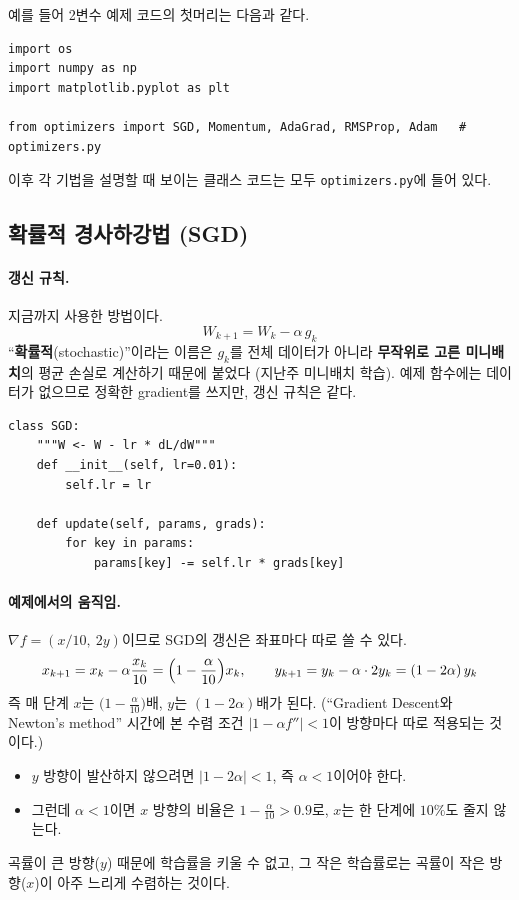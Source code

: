 \documentclass[11pt,a4paper]{article}
\begin{document}
예를 들어 2변수 예제 코드의 첫머리는 다음과 같다.
\begin{lstlisting}
import os
import numpy as np
import matplotlib.pyplot as plt

from optimizers import SGD, Momentum, AdaGrad, RMSProp, Adam   # optimizers.py
\end{lstlisting}
이후 각 기법을 설명할 때 보이는 클래스 코드는 모두 \texttt{optimizers.py}에 들어 있다.

\subsection{확률적 경사하강법 (SGD)}\label{sec:sgd}

\paragraph{갱신 규칙.}
지금까지 사용한 방법이다.
\[
\boxed{
W_{k+1}=W_k-\alpha\,g_k
}
\]
``\textbf{확률적}(stochastic)''이라는 이름은 $g_k$를 전체 데이터가 아니라
\textbf{무작위로 고른 미니배치}의 평균 손실로 계산하기 때문에 붙었다 (지난주 미니배치 학습).
예제 함수에는 데이터가 없으므로 정확한 gradient를 쓰지만, 갱신 규칙은 같다.

\begin{lstlisting}
class SGD:
    """W <- W - lr * dL/dW"""
    def __init__(self, lr=0.01):
        self.lr = lr

    def update(self, params, grads):
        for key in params:
            params[key] -= self.lr * grads[key]
\end{lstlisting}

\paragraph{예제에서의 움직임.}
$\nabla f=(x/10,\ 2y)$이므로 SGD의 갱신은 좌표마다 따로 쓸 수 있다.
\[
x_{k+1}=x_k-\alpha\frac{x_k}{10}=\Bigl(1-\frac{\alpha}{10}\Bigr)x_k,
\qquad
y_{k+1}=y_k-\alpha\cdot2y_k=(1-2\alpha)\,y_k
\]
즉 매 단계 $x$는 $\bigl(1-\frac{\alpha}{10}\bigr)$배, $y$는 $(1-2\alpha)$배가 된다.
(``Gradient Descent와 Newton's method'' 시간에 본 수렴 조건 $|1-\alpha f''|<1$이 방향마다 따로 적용되는 것이다.)

\begin{itemize}[leftmargin=1.8em]
\item $y$ 방향이 발산하지 않으려면 $|1-2\alpha|<1$, 즉 $\alpha<1$이어야 한다.
\item 그런데 $\alpha<1$이면 $x$ 방향의 비율은 $1-\frac{\alpha}{10}>0.9$로, $x$는 한 단계에 $10\%$도 줄지 않는다.
\end{itemize}
곡률이 큰 방향($y$) 때문에 학습률을 키울 수 없고,
그 작은 학습률로는 곡률이 작은 방향($x$)이 아주 느리게 수렴하는 것이다.
\end{document}
